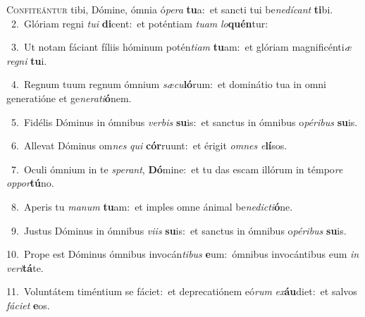 \lettrine{\initial\textcolor{\initialcolor}{C}}{onfiteántur} tibi, Dómine, ómnia ó\-\textit{pe}\-\textit{ra} \textbf{tu}\-a:~\star et sancti tui be\-\textit{ne}\-\textit{dí}\textit{cant} \textbf{ti}\-bi.\\
{\numbfont\textcolor{\numbcolor}{~2.}}~Glóriam regni \textit{tu}\-\textit{i} \textbf{di}\-cent:~\star et poténtiam \textit{tu}\-\textit{am} \textit{lo}\-\textbf{quén}tur:\par
{\numbfont\textcolor{\numbcolor}{~3.}}~Ut notam fáciant fíliis hóminum potén\-\textit{ti}\-\textit{am} \textbf{tu}\-am:~\star et glóriam magnificénti\textit{æ} \textit{re}\-\textit{gni} \textbf{tu}\-i.\par
{\numbfont\textcolor{\numbcolor}{~4.}}~Regnum tuum regnum ómnium \textit{sæ}\-\textit{cu}\textbf{ló}rum:~\star et dominátio tua in omni generatióne et ge\-\textit{ne}\-\textit{ra}\textit{ti}\textbf{ó}nem.\par
{\numbfont\textcolor{\numbcolor}{~5.}}~Fidélis Dóminus in ómnibus \textit{ver}\-\textit{bis} \textbf{su}\-is:~\star et sanctus in ómnibus o\-\textit{pé}\-\textit{ri}\textit{bus} \textbf{su}\-is.\par
{\numbfont\textcolor{\numbcolor}{~6.}}~Allevat Dóminus om\textit{nes} \textit{qui} \textbf{cór}\-ruunt:~\star et érigit \textit{om}\-\textit{nes} \textit{e}\-\textbf{lí}sos.\par
{\numbfont\textcolor{\numbcolor}{~7.}}~Oculi ómnium in te \textit{spe}\-\textit{rant}, \textbf{Dó}\-mine:~\star et tu das escam illórum in témpo\textit{re} \textit{op}\-\textit{por}\textbf{tú}no.\par
{\numbfont\textcolor{\numbcolor}{~8.}}~Aperis tu \textit{ma}\-\textit{num} \textbf{tu}\-am:~\star et imples omne ánimal be\-\textit{ne}\-\textit{dic}\textit{ti}\textbf{ó}ne.\par
{\numbfont\textcolor{\numbcolor}{~9.}}~Justus Dóminus in ómnibus \textit{vi}\-\textit{is} \textbf{su}\-is:~\star et sanctus in ómnibus o\-\textit{pé}\-\textit{ri}\textit{bus} \textbf{su}\-is.\par
{\numbfont\textcolor{\numbcolor}{10.}}~Prope est Dóminus ómnibus invocán\-\textit{ti}\-\textit{bus} \textbf{e}\-um:~\star ómnibus invocántibus eum \textit{in} \textit{ve}\-\textit{ri}\textbf{tá}te.\par
{\numbfont\textcolor{\numbcolor}{11.}}~Voluntátem timéntium se fáciet:~\dagger et deprecatiónem eó\textit{rum} \textit{ex}\-\textbf{áu}diet:~\star et salvos \textit{fá}\-\textit{ci}\textit{et} \textbf{e}\-os.\par
